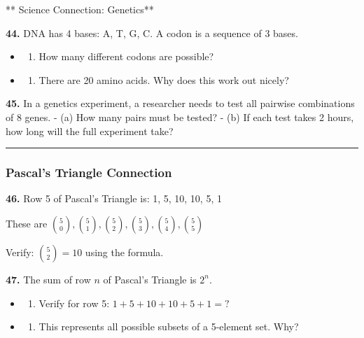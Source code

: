 \documentclass[
  11pt,
]{article}
\providecommand{\tightlist}{%
  \setlength{\itemsep}{0pt}\setlength{\parskip}{0pt}}
\begin{document}
** Science Connection: Genetics**

\textbf{44.} DNA has 4 bases: A, T, G, C. A codon is a sequence of 3
bases.

\begin{itemize}
\item
  \begin{enumerate}
  \def\labelenumi{(\alph{enumi})}
  \tightlist
  \item
    How many different codons are possible?
  \end{enumerate}
\item
  \begin{enumerate}
  \def\labelenumi{(\alph{enumi})}
  \setcounter{enumi}{1}
  \tightlist
  \item
    There are 20 amino acids. Why does this work out nicely?
  \end{enumerate}
\end{itemize}

\textbf{45.} In a genetics experiment, a researcher needs to test all
pairwise combinations of 8 genes. - (a) How many pairs must be tested? -
(b) If each test takes 2 hours, how long will the full experiment take?

\begin{center}\rule{0.5\linewidth}{0.5pt}\end{center}

\hypertarget{pascals-triangle-connection}{%
\subsubsection{Pascal's Triangle
Connection}\label{pascals-triangle-connection}}

\textbf{46.} Row 5 of Pascal's Triangle is: 1, 5, 10, 10, 5, 1

These are
\(\binom{5}{0}, \binom{5}{1}, \binom{5}{2}, \binom{5}{3}, \binom{5}{4}, \binom{5}{5}\)

Verify: \(\binom{5}{2} = 10\) using the formula.

\textbf{47.} The sum of row \(n\) of Pascal's Triangle is \(2^n\).

\begin{itemize}
\item
  \begin{enumerate}
  \def\labelenumi{(\alph{enumi})}
  \tightlist
  \item
    Verify for row 5: \(1 + 5 + 10 + 10 + 5 + 1 = ?\)
  \end{enumerate}
\item
  \begin{enumerate}
  \def\labelenumi{(\alph{enumi})}
  \setcounter{enumi}{1}
  \tightlist
  \item
    This represents all possible subsets of a 5-element set. Why?
  \end{enumerate}
\end{itemize}
\end{document}
